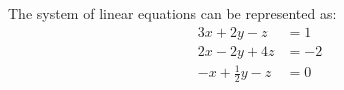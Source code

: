 \documentclass{article}
\begin{document}
The system of linear equations can be represented as:
\begin{align}
3x + 2y - z &= 1 \\
2x - 2y + 4z &= -2 \\
-x + \frac{1}{2}y - z &= 0
\end{align}
\end{document}
